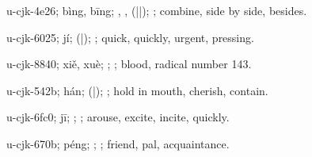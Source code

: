 \begin{multicols}{2}
{\cjkgGlue{}u-cjk-4e26; bìng, bīng; \cjkgGlue{}, \cjkgGlue{}\cjkgGlue{}\cjkgGlue{}, \cjkgGlue{}\cjkgGlue{}(\cjkgGlue{}|\cjkgGlue{}|\cjkgGlue{}); \cjkgGlue{}; combine, side by side, besides.

\cjkgGlue{}u-cjk-6025; jí; \cjkgGlue{}\cjkgGlue{}(\cjkgGlue{}|\cjkgGlue{}); \cjkgGlue{}; quick, quickly, urgent, pressing.

\cjkgGlue{}u-cjk-8840; xiě, xuè; \cjkgGlue{}; \cjkgGlue{}; blood, radical number 143.

\cjkgGlue{}u-cjk-542b; hán; \cjkgGlue{}\cjkgGlue{}(\cjkgGlue{}|\cjkgGlue{}); \cjkgGlue{}; hold in mouth, cherish, contain.

\cjkgGlue{}u-cjk-6fc0; jī; \cjkgGlue{}\cjkgGlue{}\cjkgGlue{}; \cjkgGlue{}; arouse, excite, incite, quickly.

\cjkgGlue{}u-cjk-670b; péng; \cjkgGlue{}; \cjkgGlue{}; friend, pal, acquaintance.

}
\end{multicols}
